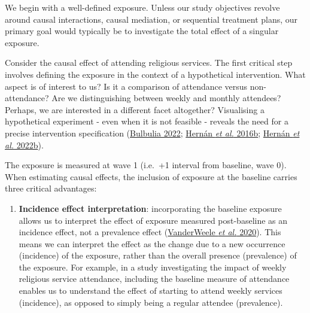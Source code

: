 \documentclass[
  singlecolumn]{article}
\providecommand{\tightlist}{%
  \setlength{\itemsep}{0pt}\setlength{\parskip}{0pt}}\usepackage{longtable,booktabs,array}
\begin{document}
We begin with a well-defined exposure. Unless our study objectives
revolve around causal interactions, causal mediation, or sequential
treatment plans, our primary goal would typically be to investigate the
total effect of a singular exposure.

Consider the causal effect of attending religious services. The first
critical step involves defining the exposure in the context of a
hypothetical intervention. What aspect is of interest to us? Is it a
comparison of attendance versus non-attendance? Are we distinguishing
between weekly and monthly attendees? Perhaps, we are interested in a
different facet altogether? Visualising a hypothetical experiment - even
when it is not feasible - reveals the need for a precise intervention
specification (\protect\hyperlink{ref-bulbulia2022}{Bulbulia 2022};
\protect\hyperlink{ref-hernuxe1n2016a}{Hernán \emph{et al.} 2016b};
\protect\hyperlink{ref-hernuxe1n2022}{Hernán \emph{et al.} 2022b}).

The exposure is measured at wave 1 (i.e.~+1 interval from baseline, wave
0). When estimating causal effects, the inclusion of exposure at the
baseline carries three critical advantages:

\begin{enumerate}
\def\labelenumi{\alph{enumi}.}
\tightlist
\item
  \textbf{Incidence effect interpretation}: incorporating the baseline
  exposure allows us to interpret the effect of exposure measured
  post-baseline as an incidence effect, not a prevalence effect
  (\protect\hyperlink{ref-vanderweele2020}{VanderWeele \emph{et al.}
  2020}). This means we can interpret the effect as the change due to a
  new occurrence (incidence) of the exposure, rather than the overall
  presence (prevalence) of the exposure. For example, in a study
  investigating the impact of weekly religious service attendance,
  including the baseline measure of attendance enables us to understand
  the effect of starting to attend weekly services (incidence), as
  opposed to simply being a regular attendee (prevalence).
\end{enumerate}
\end{document}

